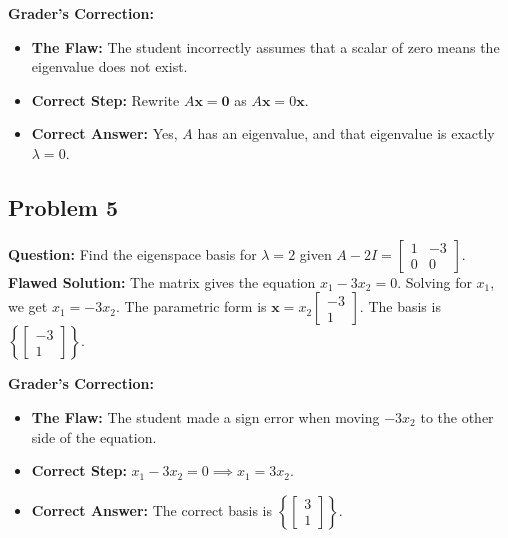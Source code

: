 \documentclass[11pt, a4paper]{article}
\theoremstyle{definition}
\theoremstyle{remark}
\begin{document}
\textbf{Grader's Correction:}
\begin{itemize}
    \item \textbf{The Flaw:} The student incorrectly assumes that a scalar of zero means the eigenvalue does not exist.
    \item \textbf{Correct Step:} Rewrite $A\mathbf{x} = \mathbf{0}$ as $A\mathbf{x} = 0\mathbf{x}$.
    \item \textbf{Correct Answer:} Yes, $A$ has an eigenvalue, and that eigenvalue is exactly $\lambda = 0$.
\end{itemize}

\subsection{Problem 5}
\textbf{Question:} Find the eigenspace basis for $\lambda = 2$ given $A - 2I = \begin{bmatrix} 1 & -3 \\ 0 & 0 \end{bmatrix}$.
\textbf{Flawed Solution:}
The matrix gives the equation $x_1 - 3x_2 = 0$.
Solving for $x_1$, we get $x_1 = -3x_2$.
The parametric form is $\mathbf{x} = x_2 \begin{bmatrix} -3 \\ 1 \end{bmatrix}$. The basis is $\left\{ \begin{bmatrix} -3 \\ 1 \end{bmatrix} \right\}$.

\textbf{Grader's Correction:}
\begin{itemize}
    \item \textbf{The Flaw:} The student made a sign error when moving $-3x_2$ to the other side of the equation.
    \item \textbf{Correct Step:} $x_1 - 3x_2 = 0 \implies x_1 = 3x_2$.
    \item \textbf{Correct Answer:} The correct basis is $\left\{ \begin{bmatrix} 3 \\ 1 \end{bmatrix} \right\}$.
\end{itemize}
\end{document}
